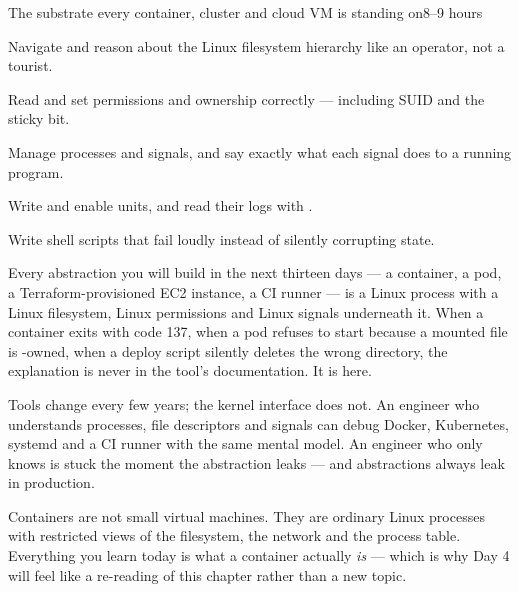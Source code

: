 %
{The substrate every container, cluster and cloud VM is standing on}{8--9 hours}

\begin{objectives}
\begin{wbitem}
  \item Navigate and reason about the Linux filesystem hierarchy like an operator, not a tourist.
  \item Read and set permissions and ownership correctly --- including SUID and the sticky bit.
  \item Manage processes and signals, and say exactly what each signal does to a running program.
  \item Write and enable  units, and read their logs with .
  \item Write shell scripts that fail loudly instead of silently corrupting state.
\end{wbitem}
\end{objectives}


 Every abstraction you will build in the next thirteen days --- a container, a pod, a Terraform-provisioned EC2 instance, a CI runner --- is a Linux process with a Linux filesystem, Linux permissions and Linux signals underneath it. When a container exits with code 137, when a pod refuses to start because a mounted file is -owned, when a deploy script silently deletes the wrong directory, the explanation is never in the tool's documentation. It is here.

 Tools change every few years; the kernel interface does not. An engineer who understands processes, file descriptors and signals can debug Docker, Kubernetes, systemd and a CI runner with the same mental model. An engineer who only knows  is stuck the moment the abstraction leaks --- and abstractions always leak in production.

\begin{keyidea}
Containers are not small virtual machines. They are ordinary Linux processes with restricted views of the filesystem, the network and the process table. Everything you learn today is what a container actually \emph{is} --- which is why Day 4 will feel like a re-reading of this chapter rather than a new topic.
\end{keyidea}

